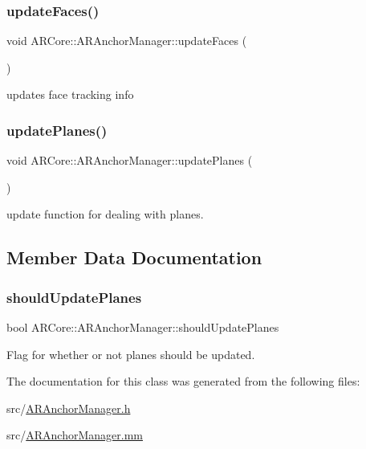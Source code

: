 \subsubsection{\texorpdfstring{update\+Faces()}{updateFaces()}}
{\footnotesize\ttfamily void A\+R\+Core\+::\+A\+R\+Anchor\+Manager\+::update\+Faces (\begin{DoxyParamCaption}{ }\end{DoxyParamCaption})}



updates face tracking info 

\mbox{\label{class_a_r_core_1_1_a_r_anchor_manager_aa35c3487e0ba5980ff6b2fb43414bd57}} 
\subsubsection{\texorpdfstring{update\+Planes()}{updatePlanes()}}
{\footnotesize\ttfamily void A\+R\+Core\+::\+A\+R\+Anchor\+Manager\+::update\+Planes (\begin{DoxyParamCaption}{ }\end{DoxyParamCaption})}



update function for dealing with planes. 



\subsection{Member Data Documentation}
\mbox{\label{class_a_r_core_1_1_a_r_anchor_manager_af67de0a611ff8a2786891eabb0ca571f}} 
\subsubsection{\texorpdfstring{should\+Update\+Planes}{shouldUpdatePlanes}}
{\footnotesize\ttfamily bool A\+R\+Core\+::\+A\+R\+Anchor\+Manager\+::should\+Update\+Planes}



Flag for whether or not planes should be updated. 



The documentation for this class was generated from the following files\+:\begin{DoxyCompactItemize}
\item 
src/\hyperlink{_a_r_anchor_manager_8h}{A\+R\+Anchor\+Manager.\+h}\item 
src/\hyperlink{_a_r_anchor_manager_8mm}{A\+R\+Anchor\+Manager.\+mm}\end{DoxyCompactItemize}

